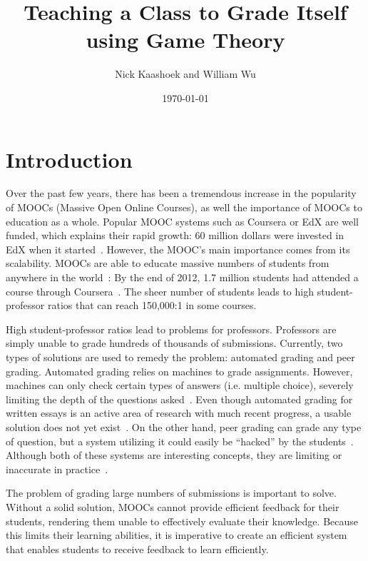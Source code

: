 \documentclass[12pt, Arial]{article}
\title{Teaching a Class to Grade Itself using Game Theory}
\author{Nick Kaashoek and William Wu}
\date{\today}
\begin{document}
\maketitle
\section{Introduction}
Over the past few years, there has been a tremendous increase in the popularity of MOOCs (Massive Open Online Courses), as well the importance of MOOCs to education as a whole. Popular MOOC systems such as Coursera or EdX are well funded, which explains their rapid growth: 60 million dollars were invested in EdX when it started~\cite{canmoocsreducecc}. However, the MOOC's main importance comes from its scalability. MOOCs are able to educate massive numbers of students from anywhere in the world~\cite{makingsenseofmoocs}: By the end of 2012, 1.7 million students had attended a course through Coursera~\cite{swotanalysisofmoocs}. The sheer number of students leads to high student-professor ratios that can reach 150,000:1 in some courses.

High student-professor ratios lead to problems for professors. Professors are simply unable to grade hundreds of thousands of submissions. Currently, two types of solutions are used to remedy the problem: automated grading and peer grading. Automated grading relies on machines to grade assignments. However, machines can only check certain types of answers (i.e. multiple choice), severely limiting the depth of the questions asked~\cite{rightandwrongmoocs}. Even though automated grading for written essays is an active area of research with much recent progress, a usable solution does not yet exist~\cite{automatedsystemssuck}. On the other hand, peer grading can grade any type of question, but a system utilizing it could easily be ``hacked'' by the students~\cite{makingsenseofmoocs}. Although both of these systems are interesting concepts, they are limiting or inaccurate in practice~\cite{howaccurateispeergrading}.

The problem of grading large numbers of submissions is important to solve. Without a solid solution, MOOCs cannot provide efficient feedback for their students, rendering them unable to effectively evaluate their knowledge. Because this limits their learning abilities, it is imperative to create an efficient system that enables students to receive feedback to learn efficiently.
\end{document}
